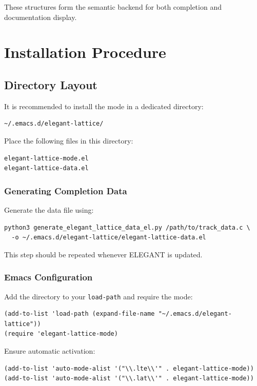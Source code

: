 These structures form the semantic backend for both completion and documentation display.

\section{Installation Procedure}

\subsection{Directory Layout}

It is recommended to install the mode in a dedicated directory:

\begin{lstlisting}
~/.emacs.d/elegant-lattice/
\end{lstlisting}

Place the following files in this directory:

\begin{lstlisting}
elegant-lattice-mode.el
elegant-lattice-data.el
\end{lstlisting}

\subsubsection{Generating Completion Data}

Generate the data file using:

\begin{lstlisting}
python3 generate_elegant_lattice_data_el.py /path/to/track_data.c \
  -o ~/.emacs.d/elegant-lattice/elegant-lattice-data.el
\end{lstlisting}

This step should be repeated whenever ELEGANT is updated.

\subsubsection{Emacs Configuration}

Add the directory to your \texttt{load-path} and require the mode:

\begin{lstlisting}
(add-to-list 'load-path (expand-file-name "~/.emacs.d/elegant-lattice"))
(require 'elegant-lattice-mode)
\end{lstlisting}

Ensure automatic activation:

\begin{lstlisting}
(add-to-list 'auto-mode-alist '("\\.lte\\'" . elegant-lattice-mode))
(add-to-list 'auto-mode-alist '("\\.lat\\'" . elegant-lattice-mode))
\end{lstlisting}

